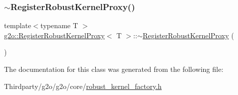 \mbox{\label{classg2o_1_1_register_robust_kernel_proxy_a01e3078be667d1faaf2046da6c219eb7}} 
\subsubsection{\texorpdfstring{$\sim$\+Register\+Robust\+Kernel\+Proxy()}{~RegisterRobustKernelProxy()}}
{\footnotesize\ttfamily template$<$typename T $>$ \\
\mbox{\hyperlink{classg2o_1_1_register_robust_kernel_proxy}{g2o\+::\+Register\+Robust\+Kernel\+Proxy}}$<$ T $>$\+::$\sim$\mbox{\hyperlink{classg2o_1_1_register_robust_kernel_proxy}{Register\+Robust\+Kernel\+Proxy}} (\begin{DoxyParamCaption}{ }\end{DoxyParamCaption})\hspace{0.3cm}{\ttfamily [inline]}}



The documentation for this class was generated from the following file\+:\begin{DoxyCompactItemize}
\item 
Thirdparty/g2o/g2o/core/\mbox{\hyperlink{robust__kernel__factory_8h}{robust\+\_\+kernel\+\_\+factory.\+h}}\end{DoxyCompactItemize}
